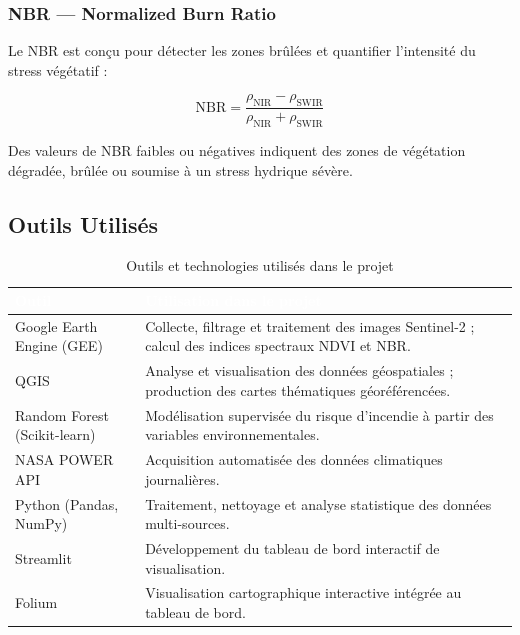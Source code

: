 \documentclass[12pt,a4paper]{report}
\begin{document}
\subsubsection{NBR --- Normalized Burn Ratio}

Le NBR est conçu pour détecter les zones brûlées et quantifier l'intensité du stress végétatif :

\begin{equation}
\text{NBR} = \frac{\rho_{\text{NIR}} - \rho_{\text{SWIR}}}{\rho_{\text{NIR}} + \rho_{\text{SWIR}}}
\label{eq:nbr}
\end{equation}

Des valeurs de NBR faibles ou négatives indiquent des zones de végétation dégradée, brûlée ou soumise à un stress hydrique sévère.

\subsection{Outils Utilisés}

\begin{table}[H]
\centering
{}
\begin{tabularx}{\textwidth}{L{4cm} X}
\toprule
{}
\textcolor{white}{\textbf{Outil}} & \textcolor{white}{\textbf{Utilisation dans le projet}} \\
\midrule
Google Earth Engine (GEE) & Collecte, filtrage et traitement des images Sentinel-2 ; calcul des indices spectraux NDVI et NBR. \\
QGIS & Analyse et visualisation des données géospatiales ; production des cartes thématiques géoréférencées. \\
Random Forest (Scikit-learn) & Modélisation supervisée du risque d'incendie à partir des variables environnementales. \\
NASA POWER API & Acquisition automatisée des données climatiques journalières. \\
Python (Pandas, NumPy) & Traitement, nettoyage et analyse statistique des données multi-sources. \\
Streamlit & Développement du tableau de bord interactif de visualisation. \\
Folium & Visualisation cartographique interactive intégrée au tableau de bord. \\
\bottomrule
\end{tabularx}
\caption{Outils et technologies utilisés dans le projet}
\label{tab:outils}
\end{table}
\end{document}
